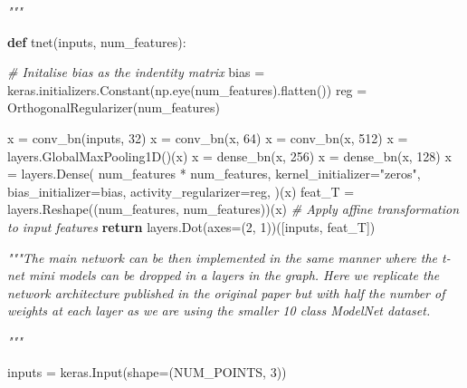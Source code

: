 \documentclass[
  12pt,
  a4paper,
]{article}
\newenvironment{Shaded}{}{}
\newcommand{\CommentTok}[1]{\textcolor[rgb]{0.38,0.63,0.69}{\textit{#1}}}
\newcommand{\ControlFlowTok}[1]{\textcolor[rgb]{0.00,0.44,0.13}{\textbf{#1}}}
\newcommand{\DecValTok}[1]{\textcolor[rgb]{0.25,0.63,0.44}{#1}}
\newcommand{\KeywordTok}[1]{\textcolor[rgb]{0.00,0.44,0.13}{\textbf{#1}}}
\newcommand{\NormalTok}[1]{#1}
\newcommand{\OperatorTok}[1]{\textcolor[rgb]{0.40,0.40,0.40}{#1}}
\newcommand{\StringTok}[1]{\textcolor[rgb]{0.25,0.44,0.63}{#1}}
\begin{document}
\begin{Shaded}
\begin{Highlighting}[]
\CommentTok{"""}

\KeywordTok{def}\NormalTok{ tnet(inputs, num\_features):}

    \CommentTok{\# Initalise bias as the indentity matrix}
\NormalTok{    bias }\OperatorTok{=}\NormalTok{ keras.initializers.Constant(np.eye(num\_features).flatten())}
\NormalTok{    reg }\OperatorTok{=}\NormalTok{ OrthogonalRegularizer(num\_features)}

\NormalTok{    x }\OperatorTok{=}\NormalTok{ conv\_bn(inputs, }\DecValTok{32}\NormalTok{)}
\NormalTok{    x }\OperatorTok{=}\NormalTok{ conv\_bn(x, }\DecValTok{64}\NormalTok{)}
\NormalTok{    x }\OperatorTok{=}\NormalTok{ conv\_bn(x, }\DecValTok{512}\NormalTok{)}
\NormalTok{    x }\OperatorTok{=}\NormalTok{ layers.GlobalMaxPooling1D()(x)}
\NormalTok{    x }\OperatorTok{=}\NormalTok{ dense\_bn(x, }\DecValTok{256}\NormalTok{)}
\NormalTok{    x }\OperatorTok{=}\NormalTok{ dense\_bn(x, }\DecValTok{128}\NormalTok{)}
\NormalTok{    x }\OperatorTok{=}\NormalTok{ layers.Dense(}
\NormalTok{        num\_features }\OperatorTok{*}\NormalTok{ num\_features,}
\NormalTok{        kernel\_initializer}\OperatorTok{=}\StringTok{"zeros"}\NormalTok{,}
\NormalTok{        bias\_initializer}\OperatorTok{=}\NormalTok{bias,}
\NormalTok{        activity\_regularizer}\OperatorTok{=}\NormalTok{reg,}
\NormalTok{    )(x)}
\NormalTok{    feat\_T }\OperatorTok{=}\NormalTok{ layers.Reshape((num\_features, num\_features))(x)}
    \CommentTok{\# Apply affine transformation to input features}
    \ControlFlowTok{return}\NormalTok{ layers.Dot(axes}\OperatorTok{=}\NormalTok{(}\DecValTok{2}\NormalTok{, }\DecValTok{1}\NormalTok{))([inputs, feat\_T])}

\CommentTok{"""The main network can be then implemented in the same manner where the t{-}net mini models}
\CommentTok{can be dropped in a layers in the graph. Here we replicate the network architecture}
\CommentTok{published in the original paper but with half the number of weights at each layer as we}
\CommentTok{are using the smaller 10 class ModelNet dataset.}

\CommentTok{"""}

\NormalTok{inputs }\OperatorTok{=}\NormalTok{ keras.Input(shape}\OperatorTok{=}\NormalTok{(NUM\_POINTS, }\DecValTok{3}\NormalTok{))}


\end{Highlighting}
\end{Shaded}
\end{document}
